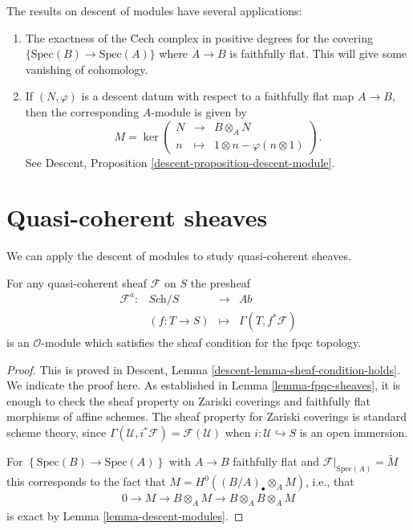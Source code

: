 \begin{remarks}
\label{remarks-theorem-modules-exactness}
The results on descent of modules have several applications:
\begin{enumerate}
\item The exactness of the \u Cech complex in positive degrees for
the covering $\{\text{Spec}(B) \to \text{Spec}(A)\}$ where $A \to B$ is
faithfully flat. This will give some vanishing of cohomology.
\item If $(N,\varphi)$ is a descent datum with respect to a faithfully
flat map $A \to B$, then the corresponding $A$-module is given by
$$
M = \ker \left(
\begin{matrix}
N & \longrightarrow & B\otimes_A N \\
n & \longmapsto & 1 \otimes n - \varphi(n\otimes 1)
\end{matrix}
\right).
$$
See
Descent, Proposition \ref{descent-proposition-descent-module}.
\end{enumerate}
\end{remarks}




\section{Quasi-coherent sheaves}
\label{section-quasi-coherent}

\noindent
We can apply the descent of modules to study quasi-coherent sheaves.

\begin{proposition}
\label{proposition-quasi-coherent-sheaf-fpqc}
For any quasi-coherent sheaf $\mathcal{F}$ on $S$ the presheaf
$$
\begin{matrix}
\mathcal{F}^a : & \textit{Sch}/S & \to & \textit{Ab}\\
& (f: T \to S) &\mapsto & \Gamma(T, f^*\mathcal{F})
\end{matrix}
$$
is an $\mathcal{O}$-module which satisfies the sheaf condition for the
fpqc topology.
\end{proposition}

\begin{proof}
This is proved in
Descent, Lemma \ref{descent-lemma-sheaf-condition-holds}.
We indicate the proof here. As established in
Lemma \ref{lemma-fpqc-sheaves},
it is enough to check the sheaf property
on Zariski coverings and faithfully flat morphisms of affine schemes. The
sheaf property for Zariski coverings is standard scheme theory, since
$\Gamma(\mathcal{U}, i^\ast \mathcal{F}) = \mathcal{F}(\mathcal{U})$ when
$i : \mathcal{U} \hookrightarrow S$ is an open immersion.

\medskip\noindent
For $\left\{\text{Spec}(B)\to \text{Spec}(A)\right\}$ with $A\to B$ faithfully
flat and
$\mathcal{F}|_{\text{Spec}(A)} = \widetilde{M}$
this corresponds to the fact that
$M = H^0\left((B/A)_\bullet\otimes_AM \right)$, i.e., that
\begin{align*}
0 \to M \to B\otimes_A M \to B\otimes_A B \otimes_A M
\end{align*}
is exact by
Lemma \ref{lemma-descent-modules}.
\end{proof}

